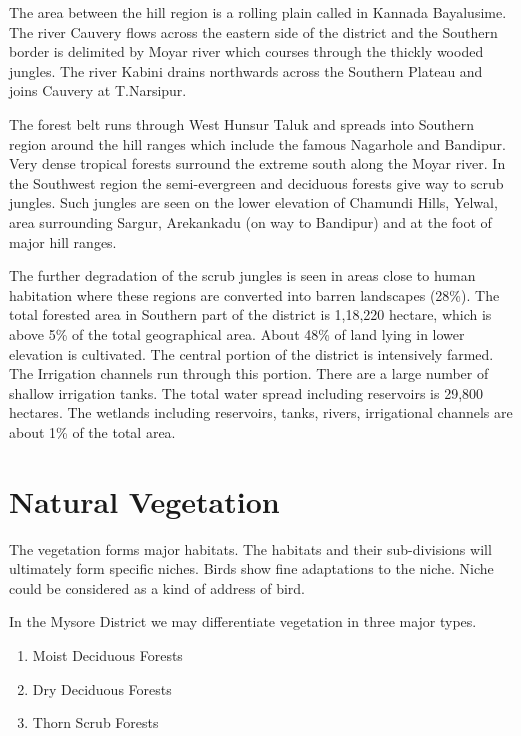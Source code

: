 The area between the hill region is a rolling plain called 
in Kannada Bayalusime. The river Cauvery flows across the eastern 
side of the district and the Southern border is delimited by 
Moyar river which courses through the thickly wooded jungles. The 
river Kabini drains northwards across the Southern Plateau and 
joins Cauvery at T.Narsipur. 

The forest belt runs through West Hunsur Taluk and spreads 
into Southern region around the hill ranges which include the 
famous Nagarhole and Bandipur. Very dense tropical forests surround 
the extreme south along the Moyar river. In the Southwest 
region the semi-evergreen and deciduous forests give way to 
scrub jungles. Such jungles are seen on the lower elevation of 
Chamundi Hills, Yelwal, area surrounding Sargur, Arekankadu (on 
way to Bandipur) and at the foot of major hill ranges. 

The further degradation of the scrub jungles is seen in 
areas close to human habitation where these regions are converted 
into barren landscapes (28\%). The total forested area in Southern 
part of the district is 1,18,220 hectare, which is above 5\% of 
the total geographical area. About 48\% of land lying in lower 
elevation is cultivated. The central portion of the district is 
intensively farmed. The Irrigation channels run through this 
portion. There are a large number of shallow irrigation tanks. 
The total water spread including reservoirs is 29,800 hectares. 
The wetlands including reservoirs, tanks, rivers, irrigational 
channels are about 1\% of the total area. 

\chapter{Natural Vegetation}

The vegetation forms major habitats. The habitats and their 
sub-divisions will ultimately form specific niches. Birds show 
fine adaptations to the niche. Niche could be considered as a 
kind of address of bird. 

In the Mysore District we may differentiate vegetation in 
three major types. 
\begin{enumerate}
\itemsep=2pt
\item Moist Deciduous Forests 

\item Dry Deciduous Forests 

\item Thorn Scrub Forests 
\end{enumerate} 

